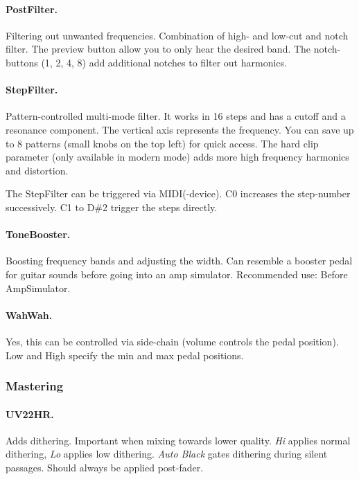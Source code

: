 \documentclass[10pt]{article}
\begin{document}
\paragraph{PostFilter.} Filtering out unwanted frequencies. Combination of high- and low-cut and notch filter. The preview button allow you to only hear the desired band. The notch-buttons (1, 2, 4, 8) add additional notches to filter out harmonics.

\paragraph{StepFilter.} Pattern-controlled multi-mode filter. It works in 16 steps and has a cutoff and a resonance component. The vertical axis represents the frequency. You can save up to 8 patterns (small knobs on the top left) for quick access. The hard clip parameter (only available in modern mode) adds more high frequency harmonics and distortion.

The StepFilter can be triggered via MIDI(-device). C0 increases the step-number successively. C1 to D\#2 trigger the steps directly.

\paragraph{ToneBooster.}

Boosting frequency bands and adjusting the width. Can resemble a booster pedal for guitar sounds before going into an amp simulator. Recommended use:  Before AmpSimulator.

\paragraph{WahWah.} Yes, this can be controlled via side-chain (volume controls the pedal position). Low and High specify the min and max pedal positions.

\subsubsection{Mastering}

\paragraph{UV22HR.}\hypertarget{UV-22HR}{} Adds dithering. Important when mixing towards lower quality. \textit{Hi} applies normal dithering, \textit{Lo} applies low dithering. \textit{Auto Black} gates dithering during silent passages. Should always be applied post-fader.
\end{document}
